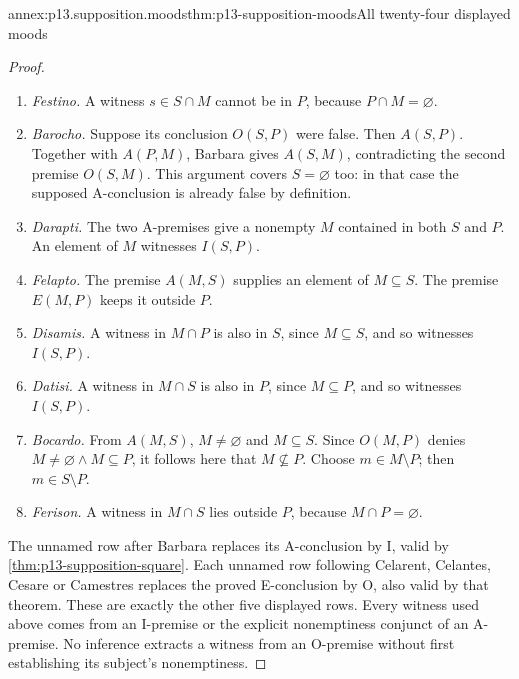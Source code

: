 \begin{annexitem}{annex:p13.supposition.moods}{thm:p13-supposition-moods}{All twenty-four displayed moods}
\begin{proof}
\begin{enumerate}[label=\arabic*.]
\item \emph{Festino.} A witness \(s\in S\cap M\) cannot be in
  \(P\), because \(P\cap M=\varnothing\).
\item \emph{Barocho.} Suppose its conclusion \(O(S,P)\) were false.
  Then \(A(S,P)\). Together with \(A(P,M)\), Barbara gives
  \(A(S,M)\), contradicting the second premise \(O(S,M)\).
  This argument covers \(S=\varnothing\) too: in that case the
  supposed A-conclusion is already false by definition.
\item \emph{Darapti.} The two A-premises give a nonempty \(M\)
  contained in both \(S\) and \(P\). An element of \(M\) witnesses
  \(I(S,P)\).
\item \emph{Felapto.} The premise \(A(M,S)\) supplies an element of
  \(M\subseteq S\). The premise \(E(M,P)\) keeps it outside \(P\).
\item \emph{Disamis.} A witness in \(M\cap P\) is also in \(S\),
  since \(M\subseteq S\), and so witnesses \(I(S,P)\).
\item \emph{Datisi.} A witness in \(M\cap S\) is also in \(P\),
  since \(M\subseteq P\), and so witnesses \(I(S,P)\).
\item \emph{Bocardo.} From \(A(M,S)\), \(M\ne\varnothing\) and
  \(M\subseteq S\). Since \(O(M,P)\) denies
  \(M\ne\varnothing\land M\subseteq P\), it follows here that
  \(M\nsubseteq P\). Choose \(m\in M\setminus P\); then
  \(m\in S\setminus P\).
\item \emph{Ferison.} A witness in \(M\cap S\) lies outside
  \(P\), because \(M\cap P=\varnothing\).
\end{enumerate}

The unnamed row after Barbara replaces its A-conclusion by I, valid by
\cref{thm:p13-supposition-square}. Each unnamed row following Celarent,
Celantes, Cesare or Camestres replaces the proved E-conclusion by O,
also valid by that theorem. These are exactly the other five displayed
rows. Every witness used above comes from an I-premise or the explicit
nonemptiness conjunct of an A-premise. No inference extracts a witness
from an O-premise without first establishing its subject's nonemptiness.
\end{proof}
\end{annexitem}

